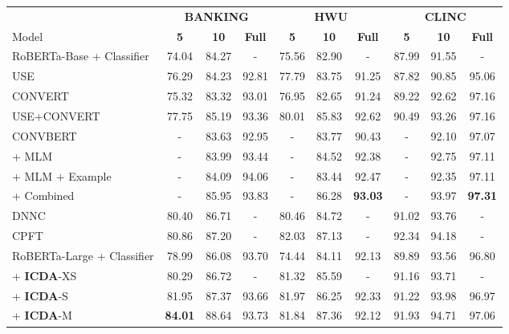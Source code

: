 \documentclass[11pt]{article}
\begin{document}
\begin{table*}[t!]
\centering
\small
\begin{tabular}{lccccccccc}
\Xhline{2\arrayrulewidth}
                        & \multicolumn{3}{c}{\textbf{BANKING}} &  \multicolumn{3}{c}{\textbf{HWU}} &\multicolumn{3}{c}{\textbf{CLINC}}\\
                        Model & \textbf{5} & \textbf{10} & \textbf{Full} & \textbf{5} &  \textbf{10} & \textbf{Full}  & \textbf{5} & \textbf{10} & \textbf{Full} \\
                        \hline
                        RoBERTa-{\small Base} + Classifier & 74.04 & 84.27 & - & 75.56 & 82.90 & - & 87.99 & 91.55 & -\\
                        USE &  76.29 & 84.23 & 92.81  & 77.79 & 83.75 & 91.25 & 87.82 & 90.85 & 95.06 \\
                        C{\small ONVE}RT & 75.32 & 83.32 & 93.01 & 76.95 & 82.65 & 91.24 & 89.22 & 92.62 & 97.16 \\
                        USE+C{\small ONVE}RT & 77.75 & 85.19 & 93.36 & 80.01 & 85.83 & 92.62 & 90.49 & 93.26 & 97.16\\
                        C{\small ONV}BERT & - & 83.63 & 92.95 & - & 83.77 & 90.43 & - & 92.10 & 97.07 \\
\quad + MLM & - & 83.99 & 93.44 & - & 84.52 & 92.38 & - & 92.75 & 97.11 \\
                        \quad + MLM + Example
                        & - & 84.09 & 94.06 & - & 83.44 & 92.47 & - & 92.35 & 97.11 \\
\quad + Combined & - &  85.95  & 93.83 & - & 86.28 & {\bf 93.03} & - & 93.97 & {\bf 97.31} \\
                        DNNC & 80.40 & 86.71 & - & 80.46 & 84.72 & - & 91.02 & 93.76 & - \\
                        CPFT & 80.86 & 87.20 & - & 82.03 & 87.13 & - & 92.34 & 94.18 & - \\
                        \hline
                        RoBERTa-{\small Large} + Classifier
                        & 78.99 & 86.08 & 93.70 & 74.44 &  84.11 & 92.13 & 89.89 & 93.56 & 96.80 \\
\quad + \textbf{ICDA}-XS  & 80.29 & 86.72 & - & 81.32 & 85.59 & - & 91.16 & 93.71 & - \\
                        \quad + \textbf{ICDA}-S  & 81.95 & 87.37 & 93.66 & 81.97 & 86.25 & 92.33 & 91.22 & 93.98 & 96.97 \\
                        \quad + \textbf{ICDA}-M & \textbf{84.01} & 88.64 & 93.73 & 81.84 & 87.36 & 92.12 & 91.93 & 94.71 & 97.06 \\

\end{tabular}
\end{table*}
\end{document}
